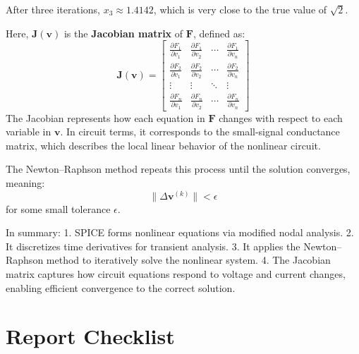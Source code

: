 \documentclass[a4paper,12pt]{article}
\begin{document}
After three iterations, \(x_3 \approx 1.4142\), which is very close to the true value of \(\sqrt{2}\).

Here, \(\mathbf{J}(\mathbf{v})\) is the \textbf{Jacobian matrix} of \(\mathbf{F}\), defined as:
\begin{equation}
\mathbf{J}(\mathbf{v}) =
\begin{bmatrix}
\frac{\partial F_1}{\partial v_1} & \frac{\partial F_1}{\partial v_2} & \cdots & \frac{\partial F_1}{\partial v_n} \\
\frac{\partial F_2}{\partial v_1} & \frac{\partial F_2}{\partial v_2} & \cdots & \frac{\partial F_2}{\partial v_n} \\
\vdots & \vdots & \ddots & \vdots \\
\frac{\partial F_n}{\partial v_1} & \frac{\partial F_n}{\partial v_2} & \cdots & \frac{\partial F_n}{\partial v_n}
\end{bmatrix}
\end{equation}
The Jacobian represents how each equation in \(\mathbf{F}\) changes with respect to each variable in \(\mathbf{v}\). In circuit terms, it corresponds to the small-signal conductance matrix, which describes the local linear behavior of the nonlinear circuit.

The Newton–Raphson method repeats this process until the solution converges, meaning:
\begin{equation}
\|\Delta \mathbf{v}^{(k)}\| < \epsilon
\end{equation}
for some small tolerance \(\epsilon\).

In summary:
1. SPICE forms nonlinear equations via modified nodal analysis.  
2. It discretizes time derivatives for transient analysis.  
3. It applies the Newton–Raphson method to iteratively solve the nonlinear system.  
4. The Jacobian matrix captures how circuit equations respond to voltage and current changes, enabling efficient convergence to the correct solution.


\section{Report Checklist}
\end{document}
